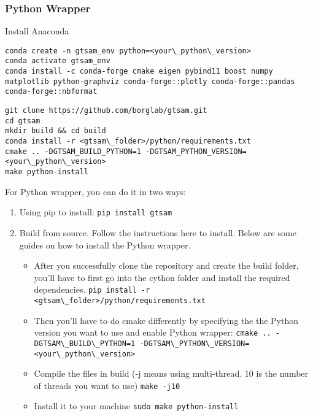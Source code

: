 \documentclass[tp]{lcc}
\begin{document}
\subsubsection{Python Wrapper}

Install Anaconda

\begin{lstlisting}[style=bash] 
conda create -n gtsam_env python=<your\_python\_version>
conda activate gtsam_env
conda install -c conda-forge cmake eigen pybind11 boost numpy matplotlib python-graphviz conda-forge::plotly conda-forge::pandas conda-forge::nbformat

\end{lstlisting}

\begin{lstlisting}[style=bash] 
git clone https://github.com/borglab/gtsam.git
cd gtsam
mkdir build && cd build
conda install -r <gtsam\_folder>/python/requirements.txt
cmake .. -DGTSAM_BUILD_PYTHON=1 -DGTSAM_PYTHON_VERSION=<your\_python\_version>
make python-install
\end{lstlisting}



For Python wrapper, you can do it in two ways:

\begin{enumerate}
    \item Using pip to install: \lstinline[style=bash]{pip install gtsam}
    \item Build from source. Follow the instructions here to install. Below are some guides on how to install the Python wrapper.
    \begin{itemize}
        \item After you successfully clone the repository and create the build folder, you'll have to first go into the cython folder and install the required dependencies. \lstinline[style=bash]{pip install -r <gtsam\_folder>/python/requirements.txt}
        \item Then you'll have to do cmake differently by specifying the the Python version you want to use and enable Python wrapper: \lstinline[style=bash]{cmake .. -DGTSAM\_BUILD\_PYTHON=1 -DGTSAM\_PYTHON\_VERSION=<your\_python\_version>}
        \item Compile the files in build (-j means using multi-thread. 10 is the number of threads you want to use) \lstinline[style=bash]{make -j10}
        \item Install it to your machine \lstinline[style=bash]{sudo make python-install}
    \end{itemize}
\end{enumerate}
\end{document}
